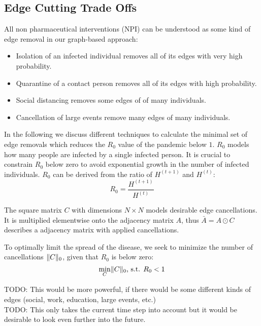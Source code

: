 \documentclass[]{article}
\DeclarePairedDelimiter\norm{\lVert}{\rVert}%
\begin{document}
\subsection{Edge Cutting Trade Offs}
All non pharmaceutical interventions (NPI) can be understood as some kind of edge removal in our graph-based approach:
\begin{itemize}
	\item Isolation of an infected individual removes all of its edges with very high probability.
	\item Quarantine of a contact person removes all of its edges with high probability.
	\item Social distancing removes some edges of of many individuals.
	\item Cancellation of large events remove many edges of many individuals.
\end{itemize}
In the following we discuss different techniques to calculate the minimal set of edge removals which reduces the $R_0$ value of the pandemic below $1$.
$R_0$ models how many people are infected by a single infected person.
It is crucial to constrain $R_0$ below zero to avoid exponential growth in the number of infected individuals.
$R_0$ can be derived from the ratio of $H^{(t+1)}$ and $H^{(t)}$:
\begin{equation}
	R_0 = \frac{H^{(t+1)}}{H^{(t)}}
\end{equation}

The square matrix $C$ with dimensions $N \times N$ models desirable edge cancellations.
It is multiplied elementwise onto the adjacency matrix $A$, thus $\bar{A} = A \odot C$ describes a adjacency matrix with applied cancellations.

To optimally limit the spread of the disease, we seek to minimize the number of cancellations $\norm{C}_0$, given that $R_0$ is below zero:
\begin{equation}
	\min_{C} \norm{C}_0\text{, s.t. }R_0 < 1
\end{equation}

TODO: This would be more powerful, if there would be some different kinds of edges (social, work, education, large events, etc.)\\
TODO: This only takes the current time step into account but it would be desirable to look even further into the future.
\end{document}
